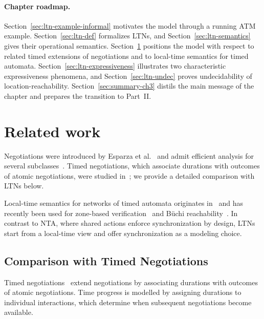 \paragraph{Chapter roadmap.} Section~\ref{sec:ltn-example-informal} motivates the model through a running ATM
example.  Section~\ref{sec:ltn-def} formalizes LTNs, and
Section~\ref{sec:ltn-semantics} gives their operational semantics.
Section~\ref{sec:ltn-related} positions the model with respect to related timed
extensions of negotiations and to local-time semantics for timed automata.
Section~\ref{sec:ltn-expressiveness} illustrates two characteristic
expressiveness phenomena, and Section~\ref{sec:ltn-undec} proves undecidability
of location-reachability.  Section~\ref{sec:summary-ch3} distils the main
message of the chapter and prepares the transition to Part~II.


\section{Related work}
\label{sec:ltn-related}

Negotiations were introduced by Esparza et al.~\cite{DBLP:conf/concur/EsparzaD13,DBLP:journals/acta/DeselEH19}
and admit efficient analysis for several subclasses~\cite{DBLP:journals/lmcs/EsparzaKMW18,DBLP:conf/lics/EsparzaMW17}.
Timed negotiations, which associate durations with outcomes of atomic
negotiations, were studied in~\cite{DBLP:conf/fossacs/AkshayGHM20}; we provide a
detailed comparison with LTNs below.

Local-time semantics for networks of timed automata originates
in~\cite{DBLP:conf/concur/BengtssonJLY98} and has recently been used for
zone-based verification~\cite{DBLP:conf/concur/GovindHSW19,DBLP:conf/lics/0001HSW22}
and B\"uchi reachability~\cite{DBLP:conf/concur/HerbreteauSW22}.  In contrast to
NTA, where shared actions enforce synchronization by design, LTNs start from a
local-time view and offer synchronization as a modeling choice.

\subsection{Comparison with Timed Negotiations~\cite{DBLP:conf/fossacs/AkshayGHM20}}
\label{subsec:ltn-vs-tn}

Timed negotiations~\cite{DBLP:conf/fossacs/AkshayGHM20} extend negotiations
by associating durations with outcomes of atomic negotiations.
Time progress is modelled by assigning durations to individual interactions,
which determine when subsequent negotiations become available.

